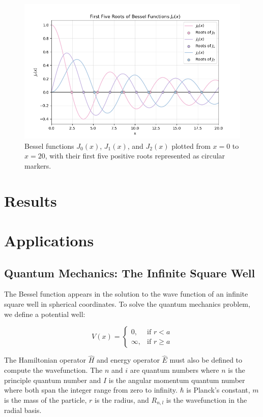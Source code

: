 \documentclass[linenumbers, RNAAS, trackchanges]{aastex631}
\begin{document}
\begin{figure}[H]
    \centering
    \includegraphics[width=0.70\linewidth]{bessel_roots.png}
    \caption{Bessel functions $J_0(x)$, $J_1(x)$, and $J_2(x)$ plotted from $x=0$ to
    $x=20$, with their first five positive roots represented as circular markers.}
    \label{fig:bessel_roots}
\end{figure}



\section{Results} \label{sec:results}


\section{Applications} \label{sec:applications}

\subsection{Quantum Mechanics: The Infinite Square Well}
The Bessel function appears in the solution to the wave function of an infinite
square well in spherical coordinates. To solve the quantum mechanics problem, we
define a potential well:

\begin{equation}
    V(x)=
    \begin{cases}
        0, &\text{if }r < a\\
        \infty, &\text{if }r\geq a
    \end{cases}
\end{equation}

The Hamiltonian operator $\hat{H}$ and energy operator $\hat{E}$ must also be
defined to compute the wavefunction. The $n$ and $i$ are quantum numbers where $n$
is the principle quantum number and $I$ is the angular momentum quantum number where
both span the integer range from zero to infinity. $\hbar$ is Planck's constant, $m$
is the mass of the particle, $r$ is the radius, and $R_{n,l}$ is the wavefunction in
the radial basis.
\end{document}
